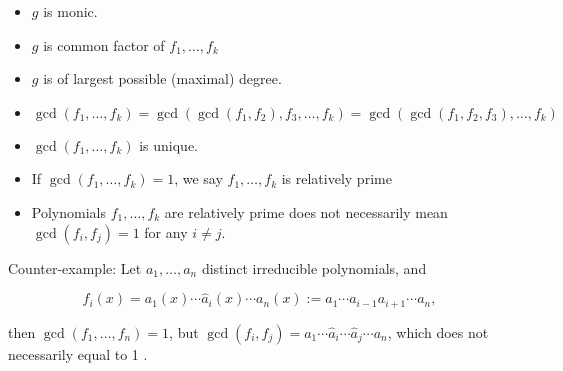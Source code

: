 \documentclass[11pt]{article}
\begin{document}
\begin{itemize}
\item \(g\) is monic.
\end{itemize}

\begin{itemize}
\item \(g\) is common factor of \({f}_1,\ldots ,{f}_{k}\)
\end{itemize}

\begin{itemize}
\item \(g\) is of largest possible (maximal) degree.
\end{itemize}

\begin{itemize}
\item \(\gcd \left( {{f}_1,\ldots ,{f}_{k}}\right)  = \gcd \left( {\gcd \left( {{f}_1,{f}_2}\right) ,{f}_{3},\ldots ,{f}_{k}}\right)  = \gcd \left( {\gcd \left( {{f}_1,{f}_2,{f}_{3}}\right) ,\ldots ,{f}_{k}}\right)\)
\end{itemize}

\begin{itemize}
\item \(\gcd \left( {{f}_1,\ldots ,{f}_{k}}\right)\) is unique.
\end{itemize}

\begin{itemize}
\item If \(\gcd \left( {{f}_1,\ldots ,{f}_{k}}\right)  = 1\), we say \({f}_1,\ldots ,{f}_{k}\) is relatively prime
\end{itemize}

\begin{itemize}
\item Polynomials \({f}_1,\ldots ,{f}_{k}\) are relatively prime does not necessarily mean \(\gcd \left( {{f}_{i},{f}_{j}}\right)  = 1\) for any \(i \neq  j\).
\end{itemize}

Counter-example: Let \({a}_1,\ldots ,{a}_n\) distinct irreducible polynomials, and

\[
{f}_{i}\left( x\right)  = {a}_1\left( x\right) \cdots {\widehat{a}}_{i}\left( x\right) \cdots {a}_n\left( x\right)  \mathrel{\text{ := }} {a}_1\cdots {a}_{i - 1}{a}_{i + 1}\cdots {a}_n,
\]

then \(\gcd \left( {{f}_1,\ldots ,{f}_n}\right)  = 1\), but \(\gcd \left( {{f}_{i},{f}_{j}}\right)  = {a}_1\cdots {\widehat{a}}_{i}\cdots {\widehat{a}}_{j}\cdots {a}_n\), which does not necessarily equal to 1 .
\end{document}
